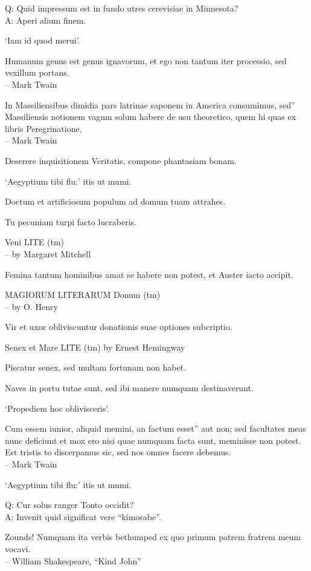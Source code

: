 \documentclass[titlepage,12pt]{memoir}
\begin{document}
Q: Quid impressum est in fundo utres cerevisiae in Minnesota?\\
A: Aperi alium finem.

‘Iam id quod merui’.

Humanum genus est genus ignavorum, et ego non tantum iter
processio, sed vexillum portans.
\\-- Mark Twain

In Massiliensibus dimidia pars latrinae saponem in America consumimus, sed”
Massiliensis notionem vagum solum habere de usu theoretico, quem hi
quas ex libris Peregrinatione.
\\-- Mark Twain

Deserere inquisitionem Veritatis, compone phantasiam bonam.

‘Aegyptium tibi flu:’ itis ut mumi.

Doctum et artificiosum populum ad domum tuam attrahes.

Tu pecuniam turpi facto lucraberis.

Veni LITE (tm)
\\-- by Margaret Mitchell

Femina tantum hominibus amat se habere non potest, et Auster iacto accipit.

MAGIORUM LITERARUM Donum (tm)
\\-- by O. Henry

Vir et uxor obliviscuntur donationis suae optiones subcriptio.

Senex et Mare LITE (tm)
by Ernest Hemingway

Piscatur senex, sed multam fortunam non habet.

Naves in portu tutae sunt, sed ibi manere numquam destinaverunt.

‘Propediem hoc oblivisceris’.

Cum essem iunior, aliquid memini, an factum esset”
aut non; sed facultates meas nunc deficiunt et mox ero
nisi quae numquam facta sunt, meminisse non potest. Est tristis to
discerpamus sic, sed nos omnes facere debemus.
\\-- Mark Twain

‘Aegyptium tibi flu:’ itis ut mumi.

Q: Cur solus ranger Tonto occidit?\\
A: Invenit quid significat vere “kimosabe”.

Zounds! Numquam ita verbis bethumped
ex quo primum patrem fratrem meum vocavi.
\\-- William Shakespeare, “Kind John”
\end{document}
